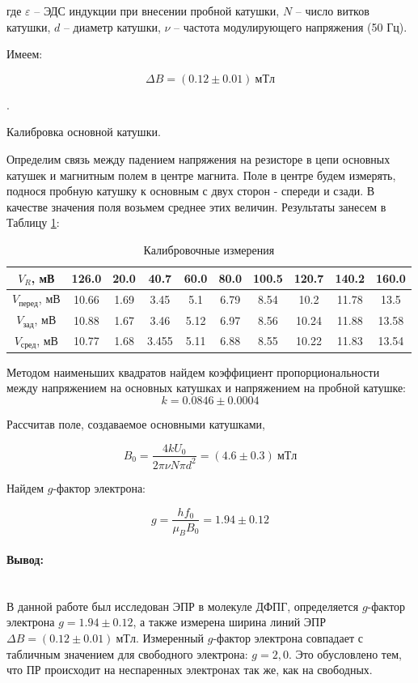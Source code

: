 \documentclass[a4paper, 12pt]{article}
\newcommand{\eps}{\varepsilon}
\newcommand{\parag}[1]{\paragraph*{#1:}}
\newcounter{Points}
\newcommand{\point}{\arabic{Points}. \addtocounter{Points}{1}}
\begin{document}
где $\eps$ -- ЭДС индукции при внесении пробной катушки, $N$ -- число витков катушки, $d$ -- диаметр катушки, $\nu$ -- частота модулирующего напряжения (50 Гц).

Имеем:

\[
    \Delta B = (0.12 \pm 0.01) ~мТл
\]

\point Калибровка основной катушки.

Определим связь между падением напряжения на резисторе в цепи основных катушек и магнитным полем в центре магнита. Поле в центре будем измерять, поднося пробную катушку к основным с двух сторон - спереди и сзади. В качестве значения поля возьмем среднее этих величин. Результаты занесем в Таблицу \ref{table:field}: 

\begin{table}[h]
\centering
\begin{tabular}{|c|c|c|c|c|c|c|c|c|c|}
    \hline
    $V_R$, мВ              & 126.0 & 20.0 & 40.7 & 60.0 & 80.0 & 100.5 & 120.7 & 140.2 & 160.0 \\ \hline
    $V_{перед}$, мВ & 10.66 & 1.69 & 3.45 & 5.1 & 6.79 & 8.54 & 10.2 & 11.78 & 13.5 \\ \hline
    $V_{зад}$, мВ   & 10.88 & 1.67 & 3.46 & 5.12 & 6.97 & 8.56 & 10.24 & 11.88 & 13.58 \\ \hline
    $V_{сред}$, мВ  & 10.77 & 1.68 & 3.455 & 5.11 & 6.88 & 8.55 & 10.22 & 11.83 & 13.54 \\ \hline
\end{tabular}
\caption{Калибровочные измерения}
\label{table:field}
\end{table}

Методом наименьших квадратов найдем коэффициент пропорциональности между напряжением на основных катушках и напряжением на пробной катушке:
\begin{equation*}
    k = 0.0846 \pm 0.0004
\end{equation*}

Рассчитав поле, создаваемое основными катушками,

\begin{equation*}
    B_0 = \frac{4 k U_0}{2\pi\nu N \pi d^2} = (4.6 \pm 0.3) ~мТл
\end{equation*}

Найдем $g$-фактор электрона:

\begin{equation*}
    g = \frac{hf_0}{\mu_BB_0} = 1.94 \pm 0.12
\end{equation*}

\parag{Вывод} ~\\

В данной работе был исследован ЭПР в молекуле ДФПГ, определяется $g$-фактор электрона $g = 1.94 \pm 0.12$, а также измерена ширина линий ЭПР $\Delta B = (0.12 \pm 0.01) ~мТл$. 
Измеренный $g$-фактор электрона совпадает с табличным значением для свободного электрона: $g = 2,0$. Это обусловлено тем, что ПР происходит на неспаренных электронах так же, как на свободных.


\end{document}
